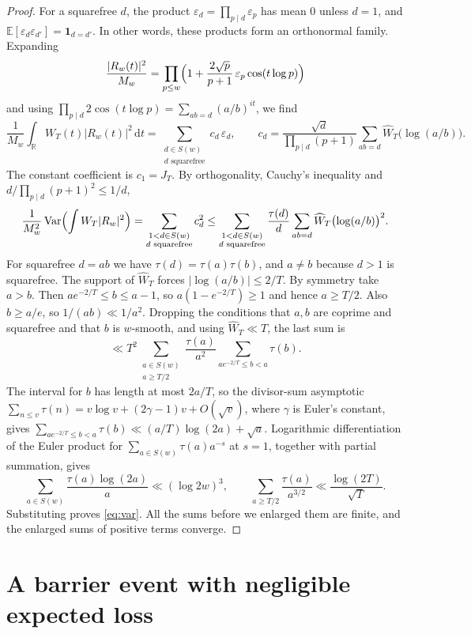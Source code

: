 \documentclass[11pt]{amsart}
\theoremstyle{remark}
\numberwithin{equation}{section}
\newcommand{\E}{\mathbb{E}}
\newcommand{\R}{\mathbb{R}}
\newcommand{\one}{\mathbf{1}}
\newcommand{\Var}{\operatorname{Var}}
\newcommand{\dd}{\,\mathrm{d}}
\begin{document}
\begin{proof}
For a squarefree $d$, the product $\varepsilon_d=\prod_{p\mid d}\varepsilon_p$ has mean $0$ unless $d=1$, and $\E[\varepsilon_d\varepsilon_{d'}]=\one_{d=d'}$. In other words, these products form an orthonormal family. Expanding
\[
\frac{|R_w(t)|^2}{M_w}=\prod_{p\le w}\Bigl(1+\frac{2\sqrt p}{p+1}\,\varepsilon_p\cos(t\log p)\Bigr)
\]
and using $\prod_{p\mid d}2\cos(t\log p)=\sum_{ab=d}(a/b)^{it}$, we find
\[
\frac{1}{M_w}\int_\R W_T(t)|R_w(t)|^2\dd t=\sum_{\substack{d\in S(w)\\ d\text{ squarefree}}}c_d\,\varepsilon_d,\qquad c_d=\frac{\sqrt d}{\prod_{p\mid d}(p+1)}\sum_{ab=d}\widehat W_T\bigl(\log(a/b)\bigr).
\]
The constant coefficient is $c_1=J_T$. By orthogonality, Cauchy's inequality and $d/\prod_{p\mid d}(p+1)^2\le1/d$,
\[
\frac{1}{M_w^2}\Var\Bigl(\int W_T|R_w|^2\Bigr)=\sum_{\substack{1<d\in S(w)\\ d\text{ squarefree}}}c_d^2\le\sum_{\substack{1<d\in S(w)\\ d\text{ squarefree}}}\frac{\tau(d)}{d}\sum_{ab=d}\widehat W_T\bigl(\log(a/b)\bigr)^2 .
\]
For squarefree $d=ab$ we have $\tau(d)=\tau(a)\tau(b)$, and $a\ne b$ because $d>1$ is squarefree. The support of $\widehat W_T$ forces $|\log(a/b)|\le2/T$. By symmetry take $a>b$. Then $ae^{-2/T}\le b\le a-1$, so $a(1-e^{-2/T})\ge1$ and hence $a\ge T/2$. Also $b\ge a/e$, so $1/(ab)\ll1/a^2$. Dropping the conditions that $a,b$ are coprime and squarefree and that $b$ is $w$-smooth, and using $\widehat W_T\ll T$, the last sum is
\[
\ll T^2\sum_{\substack{a\in S(w)\\ a\ge T/2}}\frac{\tau(a)}{a^2}\sum_{ae^{-2/T}\le b<a}\tau(b).
\]
The interval for $b$ has length at most $2a/T$, so the divisor-sum asymptotic $\sum_{n\le v}\tau(n)=v\log v+(2\gamma-1)v+O(\sqrt v)$, where $\gamma$ is Euler's constant, gives $\sum_{ae^{-2/T}\le b<a}\tau(b)\ll(a/T)\log(2a)+\sqrt a$. Logarithmic differentiation of the Euler product for $\sum_{a\in S(w)}\tau(a)a^{-s}$ at $s=1$, together with partial summation, gives
\[
\sum_{a\in S(w)}\frac{\tau(a)\log(2a)}{a}\ll(\log2w)^3,\qquad\sum_{a\ge T/2}\frac{\tau(a)}{a^{3/2}}\ll\frac{\log(2T)}{\sqrt T}.
\]
Substituting proves \eqref{eq:var}. All the sums before we enlarged them are finite, and the enlarged sums of positive terms converge.
\end{proof}

\section{A barrier event with negligible expected loss}\label{sec:barrier}
\end{document}
